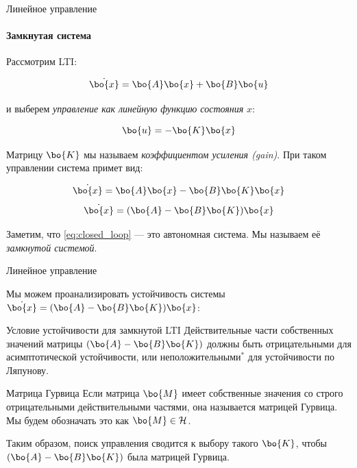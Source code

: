 \documentclass{beamer}
\begin{document}
\begin{frame}{Линейное управление}
	\framesubtitle{Замкнутая система}
	\begin{flushleft}
		
		Рассмотрим LTI:
		
		\begin{equation}
			\dot{\bo{x}} = \bo{A}\bo{x} + \bo{B}\bo{u}
		\end{equation}
		
		и выберем \emph{управление как линейную функцию состояния} $x$:
		
		\begin{equation}
			\bo{u} = -\bo{K}\bo{x}
		\end{equation}
		
		Матрицу $\bo{K}$ мы называем \emph{коэффициентом усиления (gain)}. При таком управлении система примет вид:
		
		\begin{equation}
			\dot{\bo{x}} = \bo{A}\bo{x} - \bo{B}\bo{K}\bo{x}
		\end{equation}
		\begin{equation}
			\label{eq:closed_loop}
			\dot{\bo{x}} = (\bo{A} - \bo{B}\bo{K})\bo{x}
		\end{equation}
		
		Заметим, что \eqref{eq:closed_loop} — это автономная система. Мы называем её \emph{замкнутой системой}.
		
	\end{flushleft}
\end{frame}

\begin{frame}{Линейное управление}
	\begin{flushleft}
		
		Мы можем проанализировать устойчивость системы $\dot{\bo{x}} = (\bo{A} - \bo{B}\bo{K})\bo{x}$:
		
		\begin{block}{Условие устойчивости для замкнутой LTI}
			Действительные части собственных значений матрицы $(\bo{A} - \bo{B}\bo{K})$ должны быть отрицательными для асимптотической устойчивости, или неположительными$^*$ для устойчивости по Ляпунову.
		\end{block}
		
		\begin{block}{Матрица Гурвица}
			Если матрица $\bo{M}$ имеет собственные значения со строго отрицательными действительными частями, она называется матрицей Гурвица. Мы будем обозначать это как $\bo{M} \in \mathcal{H}$.
		\end{block}
		
		
		Таким образом, поиск управления сводится к выбору такого $\bo{K}$, чтобы $(\bo{A} - \bo{B}\bo{K})$ была матрицей Гурвица. 
		
	\end{flushleft}
\end{frame}
\end{document}
